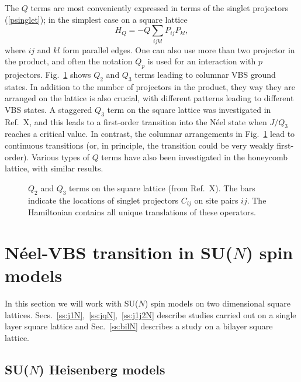 \documentclass[range]{ar2e}
\begin{document}
The $Q$ terms are most conveniently expressed in terms of the singlet projectors (\ref{psinglet}); in the simplest case on a square lattice
\begin{equation}
H_Q = - Q\sum_{ijkl} P_{ij}P_{kl},
\end{equation}
where $ij$ and $kl$ form parallel edges. One can also use more than two projector in the product, and often the notation $Q_p$ is used for an 
interaction with $p$ projectors. Fig.~\ref{qterms} shows $Q_2$ and $Q_3$ terms leading to columnar VBS ground states. In addition to the number
of projectors in the product, they way they are arranged on the lattice is also crucial, with different patterns leading to different VBS states.
A staggered $Q_3$ term on the square lattice was investigated in Ref.~X, and this leads to a first-order transition into the N\'eel state when
$J/Q_3$ reaches a critical value. In contrast, the columnar arrangements in Fig.~\ref{qterms} lead to continuous transitions (or, in principle,
the transition could be very weakly first-order). Various types of $Q$ terms have also been investigated in the honeycomb lattice,\cite{Banerjee11} 
with similar results.

\begin{figure}
\centerline{}
\caption{$Q_2$ and $Q_3$ terms on the square lattice (from Ref.~X). The bars indicate the locations of singlet projectors 
$C_{ij}$ on site pairs $ij$. The Hamiltonian contains all unique translations of these operators.}
\label{qterms}
\end{figure}

\section{N\'eel-VBS transition in SU($N$) spin models}
\label{sec:sunmodels}

In this section we will work with SU($N$) spin models on two
dimensional  square
lattices. Secs.~\ref{ss:j1N},~\ref{ss:jqN},~\ref{ss:j1j2N} describe
studies carried out on a single layer square lattice and
Sec.~\ref{ss:bilN} describes a study on a bilayer square
lattice. 

\subsection{SU($N$) Heisenberg models}
\end{document}
